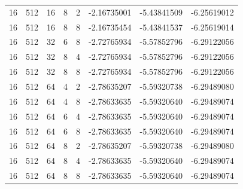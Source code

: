 \begin{longtable}{rrrrrrrr}
16 & 512 & 16 & 8 & 2 & -2.16735001 & -5.43841509 & -6.25619012\\
16 & 512 & 16 & 8 & 8 & -2.16735454 & -5.43841537 & -6.25619014\\
16 & 512 & 32 & 6 & 8 & -2.72765934 & -5.57852796 & -6.29122056\\
16 & 512 & 32 & 8 & 4 & -2.72765934 & -5.57852796 & -6.29122056\\
16 & 512 & 32 & 8 & 8 & -2.72765934 & -5.57852796 & -6.29122056\\
16 & 512 & 64 & 4 & 2 & -2.78635207 & -5.59320738 & -6.29489080\\
16 & 512 & 64 & 4 & 8 & -2.78633635 & -5.59320640 & -6.29489074\\
16 & 512 & 64 & 6 & 4 & -2.78633635 & -5.59320640 & -6.29489074\\
16 & 512 & 64 & 6 & 8 & -2.78633635 & -5.59320640 & -6.29489074\\
16 & 512 & 64 & 8 & 2 & -2.78635207 & -5.59320738 & -6.29489080\\
16 & 512 & 64 & 8 & 4 & -2.78633635 & -5.59320640 & -6.29489074\\
16 & 512 & 64 & 8 & 8 & -2.78633635 & -5.59320640 & -6.29489074\\
\end{longtable}
\normalsize
